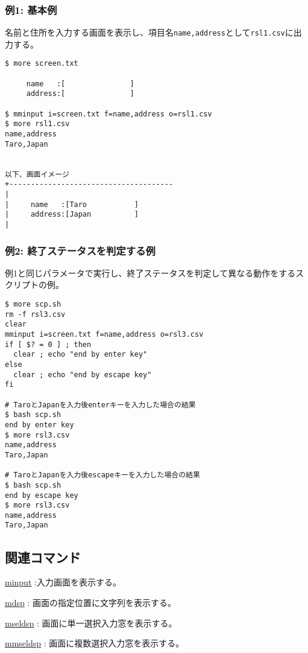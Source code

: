 \subsubsection*{例1: 基本例}

名前と住所を入力する画面を表示し、項目名\verb|name,address|として\verb|rsl1.csv|に出力する。

\begin{Verbatim}[baselinestretch=0.7,frame=single]
$ more screen.txt

     name   :[               ]
     address:[               ]

$ mminput i=screen.txt f=name,address o=rsl1.csv
$ more rsl1.csv
name,address
Taro,Japan


以下、画面イメージ
+--------------------------------------
|
|     name   :[Taro           ]
|     address:[Japan          ]
|
\end{Verbatim}

\subsubsection*{例2: 終了ステータスを判定する例}

例1と同じパラメータで実行し、終了ステータスを判定して異なる動作をするスクリプトの例。

\begin{Verbatim}[baselinestretch=0.7,frame=single]
$ more scp.sh
rm -f rsl3.csv
clear
mminput i=screen.txt f=name,address o=rsl3.csv
if [ $? = 0 ] ; then
  clear ; echo "end by enter key"
else
  clear ; echo "end by escape key"
fi

# TaroとJapanを入力後enterキーを入力した場合の結果
$ bash scp.sh
end by enter key
$ more rsl3.csv
name,address
Taro,Japan

# TaroとJapanを入力後escapeキーを入力した場合の結果
$ bash scp.sh
end by escape key
$ more rsl3.csv
name,address
Taro,Japan
\end{Verbatim}


\subsection*{関連コマンド}
\hyperref[sect:minput] {minput} :入力画面を表示する。

\hyperref[sect:mdsp] {mdsp} : 画面の指定位置に文字列を表示する。

\hyperref[sect:mseldsp] {mseldsp} : 画面に単一選択入力窓を表示する。

\hyperref[sect:mmseldsp] {mmseldsp} : 画面に複数選択入力窓を表示する。


%
